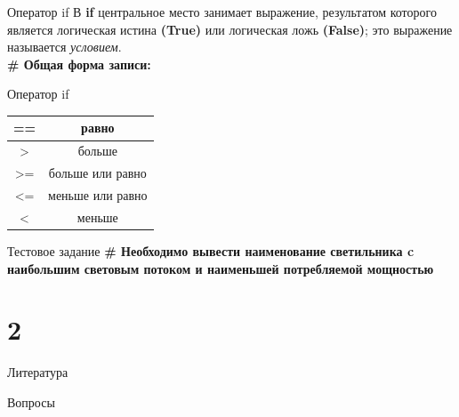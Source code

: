 \documentclass[12pt]{beamer}
\begin{document}
\begin{frame}{Оператор if}
В \textbf{if} центральное место занимает выражение, результатом которого является логическая истина \textbf{(True)} или логическая ложь \textbf{(False)}; это выражение называется \textit{условием}.\\
\vspace{0.5cm}
\textbf{\# Общая форма записи:}
\vspace{0.5cm}

\vspace{0.5cm}
\end{frame}


\begin{frame}{Оператор if}
\begin{tabular}{|c|c|}
\hline 
== & равно \\ 
\hline 
> & больше \\ 
\hline 
>= & больше или равно \\ 
\hline 
<= & меньше или равно \\ 
\hline 
< & меньше \\ 
\hline 
\end{tabular} 
\par
\vspace{0.5cm}

\end{frame}


\begin{frame}{Тестовое задание}
\textbf{\# Необходимо вывести наименование светильника c наибольшим световым потоком и наименьшей потребляемой мощностью} 
\vspace{0.5cm}

\vspace{0.5cm}
\end{frame}


\part{2}

\begin{frame}[t]{Литература}

\end{frame}

\begin{frame}[t]{Вопросы}
\vspace{0.7cm}
 \\
\end{frame}
\end{document}
